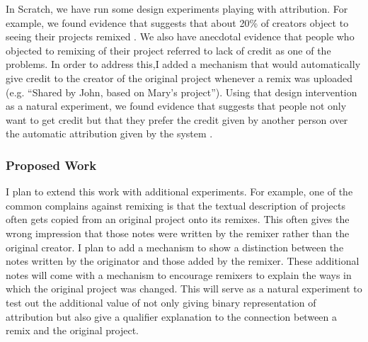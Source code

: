In Scratch, we have run some design experiments playing with attribution. 
For example, we found evidence that suggests that about 20\% of creators object to seeing their projects remixed \citep{hill_responses_2010}.
We also have anecdotal evidence that people who objected to remixing of their project referred to lack of credit as one of the problems.
In order to address this,I added a mechanism that would automatically give credit to the creator of the original project whenever a remix was uploaded (e.g. ``Shared by John, based on Mary's project'').
Using that design intervention as a natural experiment, we found evidence that suggests that people not only want to get credit but that they prefer the credit given by another person over the automatic attribution given by the system \cite{monroy-hernandez_computers_2011}. 

\subsubsection{Proposed Work}
I plan to extend this work with additional experiments.
For example, one of the common complains against remixing is that the textual description of projects often gets copied from an original project onto its remixes.
This often gives the wrong impression that those notes were written by the remixer rather than the original creator.
I plan to add a mechanism to show a distinction between the notes written by the originator and those added by the remixer.
These additional notes will come with a mechanism to encourage remixers to explain the ways in which the original project was changed.
This will serve as a natural experiment to test out the additional value of not only giving binary representation of attribution but also give a qualifier explanation to the connection between a remix and the original project.


